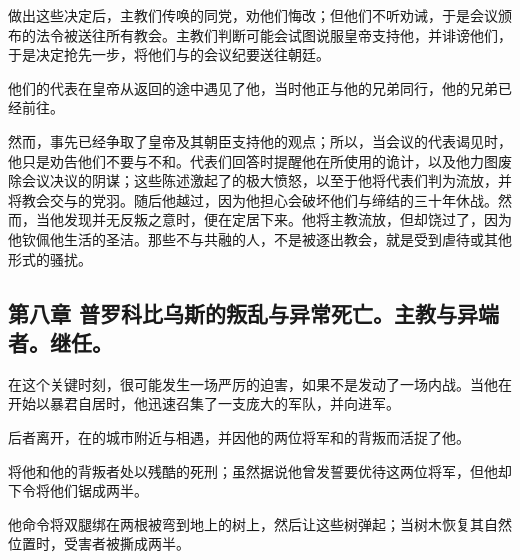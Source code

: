做出这些决定后，主教们传唤的同党，劝他们悔改；但他们不听劝诫，于是会议颁布的法令被送往所有教会。主教们判断可能会试图说服皇帝支持他，并诽谤他们，于是决定抢先一步，将他们与的会议纪要送往朝廷。\par

他们的代表在皇帝从返回的途中遇见了他，当时他正与他的兄弟同行，他的兄弟已经前往。\par

然而，事先已经争取了皇帝及其朝臣支持他的观点；所以，当会议的代表谒见时，他只是劝告他们不要与不和。代表们回答时提醒他在所使用的诡计，以及他力图废除会议决议的阴谋；这些陈述激起了的极大愤怒，以至于他将代表们判为流放，并将教会交与的党羽。随后他越过，因为他担心会破坏他们与缔结的三十年休战。然而，当他发现并无反叛之意时，便在定居下来。他将主教流放，但却饶过了，因为他钦佩他生活的圣洁。那些不与共融的人，不是被逐出教会，就是受到虐待或其他形式的骚扰。\par


\subsection{第八章 普罗科比乌斯的叛乱与异常死亡。主教与异端者。继任。}

在这个关键时刻，很可能发生一场严厉的迫害，如果不是发动了一场内战。当他在开始以暴君自居时，他迅速召集了一支庞大的军队，并向进军。\par

后者离开，在的城市附近与相遇，并因他的两位将军和的背叛而活捉了他。\par

将他和他的背叛者处以残酷的死刑；虽然据说他曾发誓要优待这两位将军，但他却下令将他们锯成两半。\par

他命令将双腿绑在两根被弯到地上的树上，然后让这些树弹起；当树木恢复其自然位置时，受害者被撕成两半。\par

